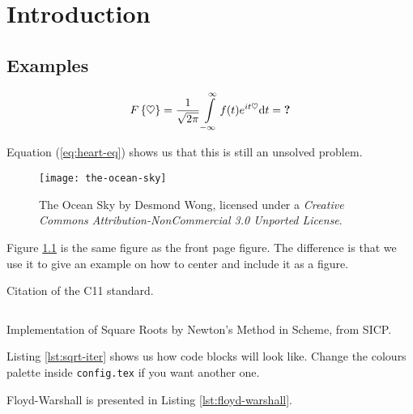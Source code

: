 
\chapter{Introduction}\label{ch:intro}

\section{Examples}

\lipsum[1-2]

\begin{equation} \label{eq:heart-eq}
  F\left\{ \heartsuit \right \} =
  \frac{1}{\sqrt{2\pi}} \int\limits_{-\infty}^{\infty} f(t) e^{i t \heartsuit} \mathrm{d} t
  = \text{\textbf{?}}
\end{equation}

Equation (\ref{eq:heart-eq}) shows us that this is still an unsolved problem.

\lipsum[3]

\begin{figure}
  \centering
  \texttt{[image: the-ocean-sky]}
  \caption[The Ocean Sky]{The Ocean Sky by Desmond Wong, licensed under a
    \emph{Creative Commons Attribution-NonCommercial 3.0 Unported License}.}
  \label{fig:ocean-sky}
\end{figure}

Figure \ref{fig:ocean-sky} is the same figure as the front page figure. The
difference is that we use it to give an example on how to center and include it
as a figure.

\lipsum[4]

Citation of the C11 standard\cite{iso2011c}.

\lipsum[11-12]

\begin{listing}
  \inputminted[frame=single,linenos,fontsize=\small,mathescape]{scm}{lst/sqrt-iter.scm}
  \caption[Square Roots in Scheme]{Implementation of Square Roots by Newton's
    Method in Scheme, from SICP.}
  \label{lst:sqrt-iter}
\end{listing}

Listing \ref{lst:sqrt-iter} shows us how code blocks will look like. Change the
colours palette inside \texttt{config.tex} if you want another one.



Floyd-Warshall is presented in Listing \ref{lst:floyd-warshall}.

\lipsum[13]
